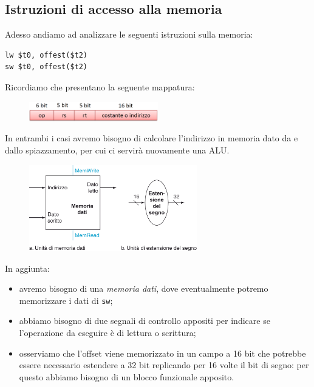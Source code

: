 \documentclass[class=book, crop=false, oneside]{standalone}
\begin{document}
\subsection{Istruzioni di accesso alla memoria}
Adesso andiamo ad analizzare le seguenti istruzioni sulla memoria:
\begin{verbatim}
lw $t0, offest($t2)
sw $t0, offest($t2)
\end{verbatim}
Ricordiamo che presentano la seguente mappatura:
\begin{figure}[H]
	\centering
	\includegraphics[width=0.5\textwidth,keepaspectratio]{I.png}
\end{figure}
In entrambi i casi avremo bisogno di calcolare l'indirizzo in memoria dato da  e dallo spiazzamento, per cui ci servirà nuovamente una ALU.
\begin{figure}[H]
	\centering
	\includegraphics[width=0.65\textwidth,keepaspectratio]{MemAccess.png}
\end{figure}
In aggiunta:
\begin{itemize}
	\item avremo bisogno di una \emph{memoria dati}, dove eventualmente potremo memorizzare i dati di \texttt{sw};
	\item abbiamo bisogno di due segnali di controllo appositi per indicare se l'operazione da eseguire è di lettura o scrittura;
	\item osserviamo che l'offset viene memorizzato in un campo a 16 bit che potrebbe essere necessario estendere a 32 bit replicando per 16 volte il bit di segno: per questo abbiamo bisogno di un blocco funzionale apposito.
\end{itemize}
\end{document}

